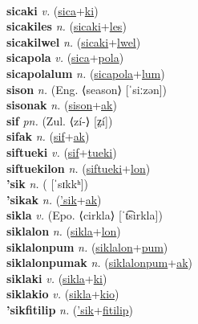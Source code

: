  \label{sicalwelkiah} \\
\textbf{sicaki} \textit{v.} (\hyperref[sica]{sica}+\hyperref[ki]{ki})
 \label{sicaki} \\
\textbf{sicakiles} \textit{n.} (\hyperref[sicaki]{sicaki}+\hyperref[les]{les})
 \label{sicakiles} \\
\textbf{sicakilwel} \textit{n.} (\hyperref[sicaki]{sicaki}+\hyperref[lwel]{lwel})
 \label{sicakilwel} \\
\textbf{sicapola} \textit{v.} (\hyperref[sica]{sica}+\hyperref[pola]{pola})
 \label{sicapola} \\
\textbf{sicapolalum} \textit{n.} (\hyperref[sicapola]{sicapola}+\hyperref[lum]{lum})
 \label{sicapolalum} \\
\textbf{sison} \textit{n.} (Eng. ⟨season⟩ [ˈsiːzən])
 \label{sison} \\
\textbf{sisonak} \textit{n.} (\hyperref[sison]{sison}+\hyperref[ak]{ak})
 \label{sisonak} \\
\textbf{sif} \textit{pn.} (Zul. ⟨zí-⟩ [z̤í])
 \label{sif} \\
\textbf{sifak} \textit{n.} (\hyperref[sif]{sif}+\hyperref[ak]{ak})
 \label{sifak} \\
\textbf{siftueki} \textit{v.} (\hyperref[sif]{sif}+\hyperref[tueki]{tueki})
 \label{siftueki} \\
\textbf{siftuekilon} \textit{n.} (\hyperref[siftueki]{siftueki}+\hyperref[lon]{lon})
 \label{siftuekilon} \\
\textbf{'sik} \textit{n.} ( [ˈsɪkkʰ])
 \label{'sik} \\
\textbf{'sikak} \textit{n.} (\hyperref['sik]{'sik}+\hyperref[ak]{ak})
 \label{'sikak} \\
\textbf{sikla} \textit{v.} (Epo. ⟨cirkla⟩ [ˈt͡sirkla])
 \label{sikla} \\
\textbf{siklalon} \textit{n.} (\hyperref[sikla]{sikla}+\hyperref[lon]{lon})
 \label{siklalon} \\
\textbf{siklalonpum} \textit{n.} (\hyperref[siklalon]{siklalon}+\hyperref[pum]{pum})
 \label{siklalonpum} \\
\textbf{siklalonpumak} \textit{n.} (\hyperref[siklalonpum]{siklalonpum}+\hyperref[ak]{ak})
 \label{siklalonpumak} \\
\textbf{siklaki} \textit{v.} (\hyperref[sikla]{sikla}+\hyperref[ki]{ki})
 \label{siklaki} \\
\textbf{siklakio} \textit{v.} (\hyperref[sikla]{sikla}+\hyperref[kio]{kio})
 \label{siklakio} \\
\textbf{'sikfitilip} \textit{n.} (\hyperref['sik]{'sik}+\hyperref[fitilip]{fitilip})
